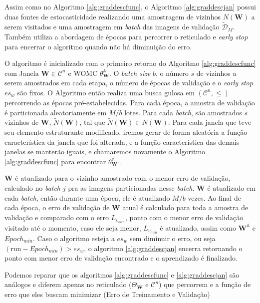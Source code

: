 Assim como no Algoritmo \ref{alg:graddescfunc}, o Algoritmo \ref{alg:graddescjan} possui duas fontes de estocasticidade realizando uma amostragem de vizinhos $N\left( \textbf{W} \right)$ a serem visitados e uma amostragem em  \textit{batch} das imagens de validação $\tilde{\mathcal{D}}_{M}$. Também utiliza a abordagem de épocas para percorrer o reticulado e \textit{early stop} para encerrar o algoritmo quando não há diminuição do erro.

O algoritmo  é inicializado com o primeiro retorno do Algoritmo \ref{alg:graddescfunc} com Janela $\textbf{W} \in \mathscr{C}^{n}$ e WOMC $\theta_{\textbf{W}}^{\mathbb{A}}$. O \textit{batch size} $b$, o número $s$ de vizinhos a serem amostrados em cada etapa, o número de épocas de validação e o \textit{early stop} $es_w$ são fixos. O Algoritmo então realiza uma busca gulosa em $\left( \mathscr{C}^{n}, \leq \right) $ percorrendo as épocas pré-estabelecidas. Para cada época, a amostra de validação é particionada aleatoriamente em $M/b$ lotes. Para cada \textit{batch}, são amostrados $s$ vizinhos de $\textbf{W}$, $\tilde{N}\left(\textbf{W}\right) $, tal que $\tilde{N}\left(\textbf{W}\right) \in N\left(\textbf{W}\right)$. Para cada janela que teve seu elemento estruturante modificado, iremos gerar de forma aleatória a função característica da janela que foi alterada, e a função característica das demais janelas se manterão iguais, e chamaremos novamente o Algoritmo \ref{alg:graddescfunc} para encontrar $\theta_{\textbf{W'}}^{\mathbb{A}}$.

$\textbf{W}$ é atualizado para o vizinho amostrado com o menor erro de validação, calculado no \textit{batch} $j$ pra as imagens particionadas nesse \textit{batch}. $\textbf{W}$ é atualizado em cada \textit{batch}, então durante uma época, ele é atualizado $M/b$ vezes. Ao final de cada época, o erro de validação de $\textbf{W}$ atual é calculado para toda a amostra de validação e comparado com o erro $ L_{v_{min}}$, ponto com o menor erro de validação visitado até o momento, caso ele seja menor,  $ L_{v_{min}}$ é atualizado, assim como $\textbf{W}^{\mathbb{A}}$ e $Epoch_{min}$. Caso o algoritmo esteja a $es_w$ sem diminuir o erro, ou seja $(\text{run} - Epoch_{min}) > es_w$, o algoritmo \ref{alg:graddescjan} encerra retornando o ponto com menor erro de validação encontrado e o aprendizado é finalizado.

Podemos reparar que os algoritmos \ref{alg:graddescfunc} e \ref{alg:graddescjan} são análogos e diferem apenas no reticulado ($ \Theta_{\textbf{W}}$ e $ \mathscr{C}^{n}$) que percorrem e a função de erro que eles buscam minimizar (Erro de Treinamento e Validação)


